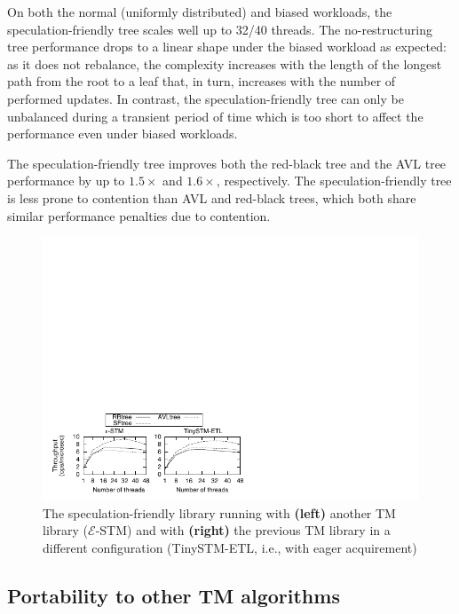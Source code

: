 On both the normal (uniformly distributed) and biased workloads, the speculation-friendly tree scales 
well up to 32/40 threads. The no-restructuring tree performance drops to a linear shape 
under the biased workload as expected: as it does not rebalance, the complexity increases with the length of the longest path from the root to a leaf that, in turn, increases with the 
number of performed updates.
In contrast, the speculation-friendly tree can only be unbalanced during a transient period of time which is too short to affect the performance 
even under biased workloads. 

The speculation-friendly tree improves both the red-black tree and the AVL tree performance by up to $1.5\times$ and $1.6\times$, respectively. 
The speculation-friendly tree is less prone to contention than AVL and red-black trees, which both share similar performance penalties due to contention.


\begin{figure}
	\begin{center}
	\includegraphics[scale=1.6,clip=true,viewport=0 0 200 83]{Tree/fig/microbench/microbench_avg_4096_u10_estm}
	\caption{The speculation-friendly library running with {\bf (left)} another TM library (${\mathcal E}$-STM) and with {\bf (right)} the previous TM library in a different configuration (TinySTM-ETL, i.e., with eager acquirement)\label{fig:estm}} 
	\end{center}
\end{figure}

\subsection{Portability to other TM algorithms}\label{ssec:othertms}

